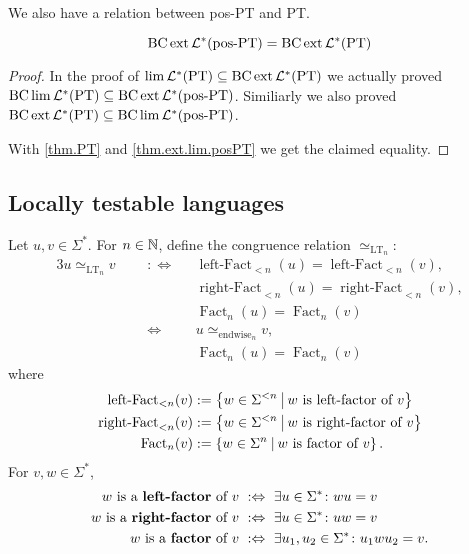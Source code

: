 We also have a relation between pos-PT and PT.

\begin{theorem}
\[ \operatorname{BC} \operatorname{ext} \mathcal{L}^*(\textup{\textrm{pos-PT}}) = \operatorname{BC} \operatorname{ext} \mathcal{L}^* (\textup{\textrm{PT}}) \]

\begin{proof}
In the proof of $\lim \mathcal{L}^*(\textup{\textrm{PT}}) \subseteq \operatorname{BC} \operatorname{ext} \mathcal{L}^* (\textup{\textrm{PT}})$ we actually proved $\operatorname{BC} \lim \mathcal{L}^*(\textup{\textrm{PT}}) \subseteq \operatorname{BC} \operatorname{ext} \mathcal{L}^* (\textup{\textrm{pos-PT}})$. Similiarly we also proved $\operatorname{BC} \operatorname{ext} \mathcal{L}^* (\textup{\textrm{PT}}) \subseteq \operatorname{BC} \lim \mathcal{L}^* (\textup{\textrm{pos-PT}})$.

With \cref{thm.PT} and \cref{thm.ext.lim.posPT} we get the claimed equality.
\end{proof}
\end{theorem}


\subsection{Locally testable languages}
\label{lang:LT}
Let $u,v \in \Sigma^*$. For $n \in \mathbb{N}$, define the congruence relation $\simeq_{\text{LT}_n}$:
\begin{alignat*}{3}
u \simeq_{\text{LT}_n} v \ \ \ && :\Leftrightarrow \ \ \ & \operatorname{left-Fact}_{<n}(u) = \operatorname{left-Fact}_{<n}(v) , \\
&&& \operatorname{right-Fact}_{<n}(u) = \operatorname{right-Fact}_{<n}(v) , \\
&&& \operatorname{Fact}_{n}(u) = \operatorname{Fact}_{n}(v) \\
&& \Leftrightarrow \ \ \ & u \simeq_{\text{endwise}_n} v , \\
&&& \operatorname{Fact}_n(u) = \operatorname{Fact}_n(v)
\end{alignat*}
where
\begin{align*}
\operatorname{left-Fact}_{<n}(v) & := \Set{w \in \Sigma^{<n}}{\text{$w$ is left-factor of $v$}} \\
\operatorname{right-Fact}_{<n}(v) & := \Set{w \in \Sigma^{<n}}{\text{$w$ is right-factor of $v$}} \\
\operatorname{Fact}_{n}(v) & := \Set{w \in \Sigma^{n}}{\text{$w$ is factor of $v$}}.
\end{align*}
For $v,w \in \Sigma^*$,
\begin{align*}
\text{$w$ is a \defword{left-factor} of $v$} & \ :\Leftrightarrow \ \exists u \in \Sigma^* \colon wu = v \\
\text{$w$ is a \defword{right-factor} of $v$} & \ :\Leftrightarrow \ \exists u \in \Sigma^* \colon uw = v \\
\text{$w$ is a \defword{factor} of $v$} & \ :\Leftrightarrow \ \exists u_1,u_2 \in \Sigma^* \colon u_1 w u_2 = v.
\end{align*}

